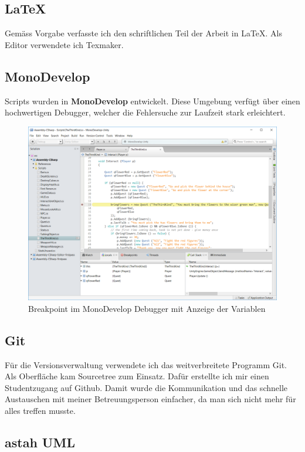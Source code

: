 \subsection{LaTeX}

Gemäss Vorgabe verfasste ich den schriftlichen Teil der Arbeit in LaTeX.
Als Editor verwendete ich Texmaker.

\subsection{MonoDevelop}

Scripts wurden in \textbf{MonoDevelop} entwickelt.
Diese Umgebung verfügt über einen hochwertigen Debugger, welcher die Fehlersuche zur Laufzeit stark erleichtert.

\begin{figure}[H]
\includegraphics[scale=0.5]{screenshots/monodevelop.png}
\caption{Breakpoint im MonoDevelop Debugger mit Anzeige der Variablen}
\end{figure}

\subsection{Git}

Für die Versionsverwaltung verwendete ich das weitverbreitete Programm Git.
Als Oberfläche kam Sourcetree zum Einsatz.
Dafür erstellte ich mir einen Studentzugang auf Github.
Damit wurde die Kommunikation und das schnelle Austauschen mit meiner Betreuungsperson einfacher, da man sich nicht mehr für alles treffen musste.

\subsection{astah UML}

